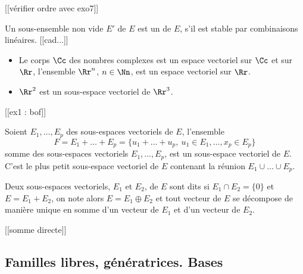 \documentclass[class=report,crop=false]{standalone}
\begin{document}
[[vérifier ordre avec exo7]]

\begin{definition}
Un sous-ensemble non vide $E'$ de $E$ est un 
 de $E$, 
s'il est stable par combinaisons linéaires.
[[cad...]] 
\end{definition}

\begin{exemple}
\begin{itemize}
  \item Le corps $\Cc$ des nombres complexes est un espace 
  vectoriel sur $\Cc$ et sur $\Rr$,  
  l'ensemble $\Rr^n$, $n\in\Nn$, est un espace vectoriel sur $\Rr$.
  
  \item $\Rr^2$ est un sous-espace vectoriel de $\Rr^3$. 
  
\end{itemize} 
\end{exemple}

[[ex1 : bof]]

\begin{proposition}
Soient $E_1,\dots,E_p$ des sous-espaces vectoriels de $E$, l'ensemble 
$$F=E_1+\dots+E_p=\{u_1+\dots+u_p,\ u_1\in E_1,\dots,x_p\in E_p\}$$
somme des sous-espaces vectoriels $E_1,\dots,E_p$, est un sous-espace vectoriel de $E$. 
C'est le plus petit sous-espace vectoriel de $E$ contenant la réunion $E_1\cup\dots\cup E_p$. 
\end{proposition}

\begin{definition}
Deux sous-espaces vectoriels, $E_1$ et $E_2$, de $E$ sont dits 
 si $E_1\cap E_2=\{0\}$ et $E=E_1+E_2$, 
on note alors $E=E_1\oplus E_2$ et tout vecteur de $E$ 
se décompose de manière unique en somme d'un vecteur de $E_1$ 
et d'un vecteur de $E_2$.
\end{definition}

[[somme directe]]

\subsection{Familles libres, génératrices. Bases}
\end{document}
